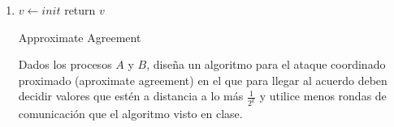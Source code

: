 \documentclass[12pt,a4paper]{report}
\begin{document}
\begin{enumerate}
	\item {
	
	\IncMargin{1em}
		\begin{algorithm}
			\BlankLine
			$v \leftarrow init$ \;
			return $v$\;
			\caption{Approximate Agreement}
		\end{algorithm}\DecMargin{1em}
		
		Dados los procesos $A$ y $B$, diseña un algoritmo para el ataque coordinado
		proximado (aproximate agreement) en el que para llegar al acuerdo deben decidir
		valores que estén a distancia a lo más $\frac{1}{2^k}$ y utilice menos rondas
		de comunicación que el algoritmo visto en clase.\\

		
	}

\end{enumerate}
\end{document}
